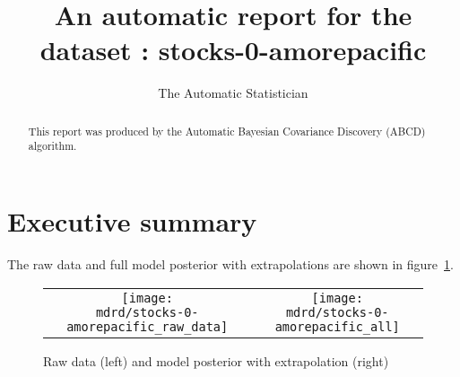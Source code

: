 \documentclass{article} %
\title{An automatic report for the dataset : stocks-0-amorepacific}
\author{
The Automatic Statistician
}
\begin{document}
\allowdisplaybreaks

\maketitle

\begin{abstract}
This report was produced by the Automatic Bayesian Covariance Discovery (ABCD) algorithm.
\end{abstract}

\section{Executive summary}

The raw data and full model posterior with extrapolations are shown in figure~\ref{fig:rawandfit}.

\begin{figure}[H]
\newcommand{\wmgd}{0.5\columnwidth}
\newcommand{\hmgd}{3.0cm}
\newcommand{\mdrd}{stocks-0-amorepacific}
\newcommand{\mbm}{\hspace{-0.3cm}}
\begin{tabular}{cc}
\mbm \texttt{[image: \\mdrd/stocks-0-amorepacific\_raw\_data]} & \texttt{[image: \\mdrd/stocks-0-amorepacific\_all]}
\end{tabular}
\caption{Raw data (left) and model posterior with extrapolation (right)}
\label{fig:rawandfit}
\end{figure}
\end{document}
